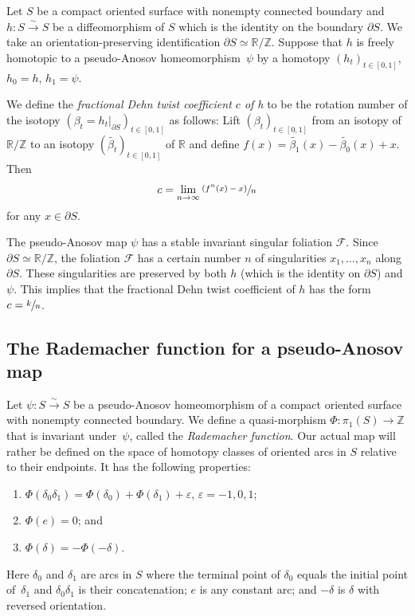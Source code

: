 \documentclass[JEP,XML,SOM,Unicode,NoFloatCountersInSection]{cedram}
\let\mathcal\mathscr
\let\epsilon\varepsilon
\newcommand{\psfrac}[2]{\sfrac{(#1)}{#2}}
\newcommand{\isom}{\stackrel\sim\longrightarrow}
\theoremstyle{plain}
\theoremstyle{definition}
\numberwithin{equation}{subsection}
\newcommand{\RR}{\mathbb{R}}
\newcommand{\ZZ}{\mathbb{Z}}
\newcommand{\cF}{\mathcal{F}}
\newcommand{\bdry}{\partial}
\newcommand{\be}{\begin{enumerate}}
\newcommand{\ee}{\end{enumerate}}
\begin{document}
Let $S$ be a compact oriented surface with nonempty connected boundary and $h: S\isom S$ be a diffeomorphism of $S$ which is the identity on the boundary $\partial S$. We take an orientation-preserving identification $\partial S \simeq\RR/\ZZ$. Suppose that $h$ is freely homotopic to a pseudo-Anosov homeomorphism~$\psi$ by a homotopy $(h_t)_{t\in [0,1]}$, $h_0 =h$, $h_1 =\psi$.

We define the {\em fractional Dehn twist coefficient $c$ of h} to be the rotation number of the isotopy $(\beta_t =h_t \vert_{\partial S})_{t\in [0,1]}$ as follows: Lift $(\beta_t)_{t\in [0,1]}$ from an isotopy of $\RR /\ZZ$ to an isotopy $(\widetilde{\beta_t})_{t\in [0,1]}$ of $\RR$ and define $f(x) =\widetilde{\beta_1} (x) -\widetilde{\beta_0} (x)+x$. Then
$$c=\lim_{n\to \infty} \psfrac{f^n(x)-x}{n}$$
for any $x\in \bdry S$.

The pseudo-Anosov map $\psi$ has a stable invariant singular foliation $\cF$. Since $\partial S\simeq \RR/\ZZ$, the foliation $\cF$ has a certain number $n$ of singularities $x_1,\dots,x_n$ along $\partial S$. These singularities are preserved by both $h$ (which is the identity on $\partial S$) and $\psi$. This implies that the fractional Dehn twist coefficient of $h$ has the form $c=\sfrac{k}{n}$.

\subsection{The Rademacher function for a pseudo-Anosov map} \label{subsection: Rademacher function}

Let $\psi : S\isom S$ be a pseudo-Anosov homeomorphism of a compact oriented surface with nonempty connected boundary. We define a quasi-morphism $\Phi: \pi_1(S) \to \ZZ$ that is invariant under~$\psi$, called the {\em Rademacher function}. Our actual map will rather be defined on the space of homotopy classes of oriented arcs in $S$ relative to their endpoints. It has the following properties:
\be\renewcommand{\theenumi}{R\arabic{enumi}}
\item\label{enum:R1}
$\Phi (\delta_0 \delta_1) =\Phi (\delta_0)+\Phi (\delta_1)+\epsilon$, $\epsilon =-1,0,1$;
\item\label{enum:R2}
$\Phi (e)=0$; and
\item\label{enum:R3}
$\Phi (\delta)=-\Phi (-\delta)$.
\ee
Here $\delta_0$ and $\delta_1$ are arcs in $S$ where the terminal point of $\delta_0$ equals the initial point of~$\delta_1$ and $\delta_0 \delta_1$ is their concatenation; $e$ is any constant arc; and $-\delta$ is $\delta$ with reversed orientation.
\end{document}
